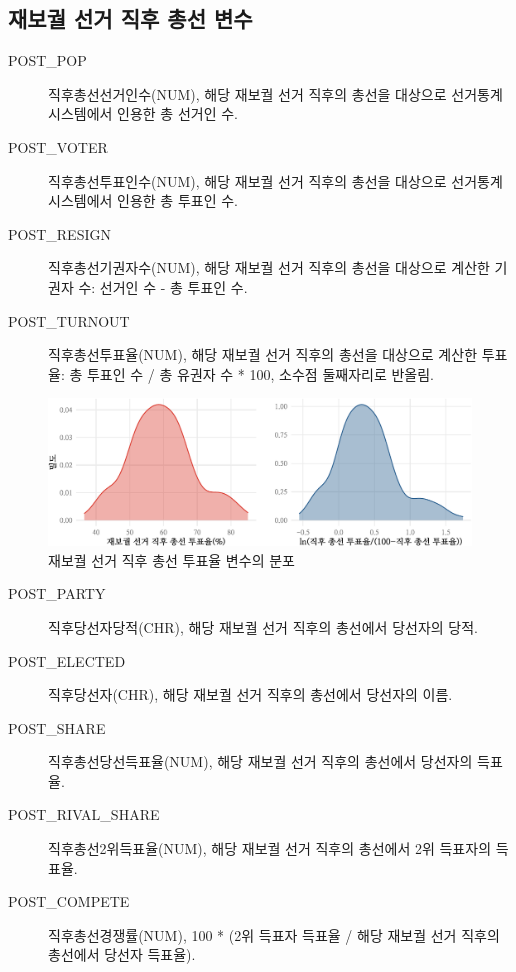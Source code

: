 \documentclass[
  11pt,
  letter]{article}
\begin{document}
\newpage

\hypertarget{uxc7acuxbcf4uxad90-uxc120uxac70-uxc9c1uxd6c4-uxcd1duxc120-uxbcc0uxc218}{%
\subsection{재보궐 선거 직후 총선
변수}\label{uxc7acuxbcf4uxad90-uxc120uxac70-uxc9c1uxd6c4-uxcd1duxc120-uxbcc0uxc218}}

\begin{description}
\item[POST\_POP]
직후총선선거인수(NUM), 해당 재보궐 선거 직후의 총선을 대상으로
선거통계시스템에서 인용한 총 선거인 수.
\item[POST\_VOTER]
직후총선투표인수(NUM), 해당 재보궐 선거 직후의 총선을 대상으로
선거통계시스템에서 인용한 총 투표인 수.
\item[POST\_RESIGN]
직후총선기권자수(NUM), 해당 재보궐 선거 직후의 총선을 대상으로 계산한
기권자 수: 선거인 수 - 총 투표인 수.
\item[POST\_TURNOUT]
직후총선투표율(NUM), 해당 재보궐 선거 직후의 총선을 대상으로 계산한
투표율: 총 투표인 수 / 총 유권자 수 * 100, 소수점 둘째자리로 반올림.
\end{description}

\begin{figure}
\centering
\includegraphics{Codebook_national_files/figure-latex/unnamed-chunk-15-1.pdf}
\caption{재보궐 선거 직후 총선 투표율 변수의 분포}
\end{figure}

\begin{description}
\item[POST\_PARTY]
직후당선자당적(CHR), 해당 재보궐 선거 직후의 총선에서 당선자의 당적.
\item[POST\_ELECTED]
직후당선자(CHR), 해당 재보궐 선거 직후의 총선에서 당선자의 이름.
\item[POST\_SHARE]
직후총선당선득표율(NUM), 해당 재보궐 선거 직후의 총선에서 당선자의
득표율.
\item[POST\_RIVAL\_SHARE]
직후총선2위득표율(NUM), 해당 재보궐 선거 직후의 총선에서 2위 득표자의
득표율.
\item[POST\_COMPETE]
직후총선경쟁률(NUM), 100 * (2위 득표자 득표율 / 해당 재보궐 선거 직후의
총선에서 당선자 득표율).
\end{description}
\end{document}
